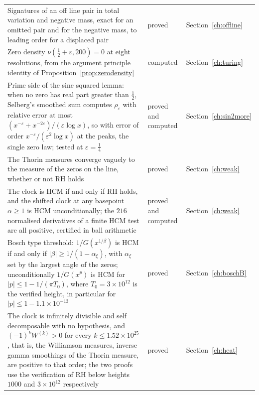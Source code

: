 {\begin{longtable}{p{}p{}p{}}
Signatures of an off line pair in total variation and negative mass, exact for an omitted pair and for the negative mass, to leading order for a displaced pair & \raggedright proved & Section~\ref{ch:offline}\\
Zero density $\nu(\frac12+\varepsilon,200)=0$ at eight resolutions, from the argument principle identity of Proposition~\ref{prop:zerodensity} & \raggedright computed & Section~\ref{ch:turing}\\
Prime side of the sine squared lemma: when no zero has real part greater than $\frac12$, Selberg's smoothed sum computes $\rho_\varepsilon$ with relative error at most $(x^{-\varepsilon}+x^{-2\varepsilon})/(\varepsilon\log x)$, so with error of order $x^{-\varepsilon}/(\varepsilon^2\log x)$ at the peaks, the single zero law; tested at $\varepsilon=\frac14$ & \raggedright proved and computed & Section~\ref{ch:sin2more}\\
The Thorin measures converge vaguely to the measure of the zeros on the line, whether or not RH holds & \raggedright proved & Section~\ref{ch:weak}\\
The clock is HCM if and only if RH holds, and the shifted clock at any basepoint $\alpha\ge1$ is HCM unconditionally; the $216$ normalised derivatives of a finite HCM test are all positive, certified in ball arithmetic & \raggedright proved and computed & Section~\ref{ch:weak}\\
Bosch type threshold: $1/G(x^{1/\beta})$ is HCM if and only if $|\beta|\ge1/(1-\alpha_\xi)$, with $\alpha_\xi$ set by the largest angle of the zeros; unconditionally $1/G(x^p)$ is HCM for $|p|\le1-1/(\pi T_0)$, where $T_0=3\times10^{12}$ is the verified height, in particular for $|p|\le1-1.1\times10^{-13}$ & \raggedright proved & Section~\ref{ch:boschB}\\
The clock is infinitely divisible and self decomposable with no hypothesis, and $(-1)^kW^{(k)}>0$ for every $k\le1.52\times10^{25}$, that is, the Williamson measures, inverse gamma smoothings of the Thorin measure, are positive to that order; the two proofs use the verification of RH below heights $1000$ and $3\times10^{12}$ respectively \cite{PT21} & \raggedright proved & Section~\ref{ch:heat}\\
\end{longtable}}

